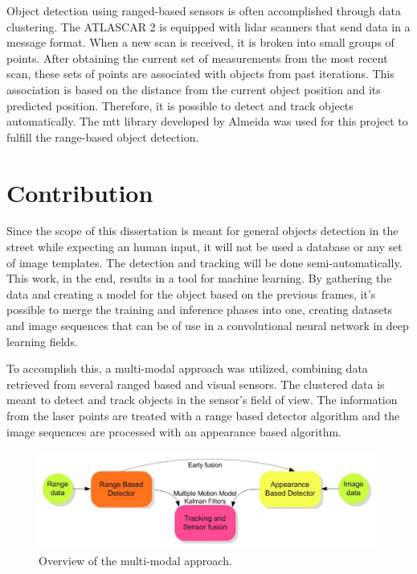 Object detection using ranged-based sensors is often accomplished through data clustering. The ATLASCAR 2 is equipped with \gls{lidar} scanners that send data in a message format. When a new scan is received, it is broken into small groups of points. After obtaining the current set of measurements from the most recent scan, these sets of points are associated with objects from past iterations. This association is based on the distance from the current object position and its predicted position. Therefore, it is possible to detect and track objects automatically. The \gls{mtt} library developed by Almeida \cite{SoaresDeAlmeida} was used for this project to fulfill the range-based object detection.


\section{Contribution}

Since the scope of this dissertation is meant for general objects detection in the street while expecting an human input, it will not be used a database or any set of image templates. The detection and tracking will be done semi-automatically. This work, in the end, results in a tool for machine learning. By gathering the data and creating a model for the object based on the previous frames, it's possible to merge the training and inference phases into one, creating datasets and image sequences that can be of use in a convolutional neural network in deep learning fields. 

To accomplish this, a multi-modal approach was utilized, combining data retrieved from several ranged based and visual sensors. The clustered data is meant to detect and track objects in the sensor's field of view. The information from the laser points are treated with a range based detector algorithm and the image sequences are processed with an appearance based algorithm. \cite{Spinello2010}

\begin{figure}[htp]
	
	\centering
	\includegraphics[width=0.99\textwidth]{capstate/imgs/multimodal.png}
	
	\caption{ Overview of the multi-modal approach. }
	\label{fig:basket}
	
\end{figure}

